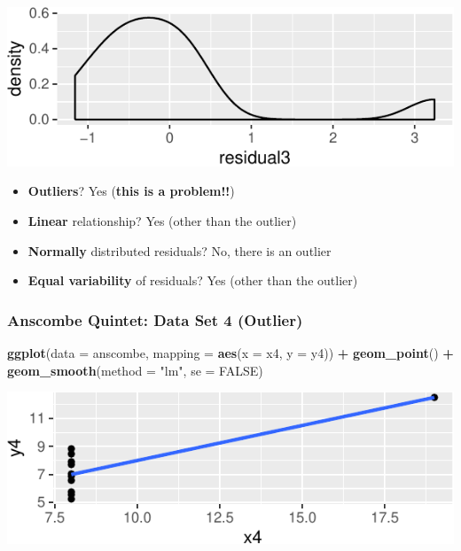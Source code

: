\documentclass[14pt]{extarticle}
\newenvironment{Shaded}{\begin{snugshade}}{\end{snugshade}}
\newcommand{\KeywordTok}[1]{\textcolor[rgb]{0.13,0.29,0.53}{\textbf{#1}}}
\newcommand{\DataTypeTok}[1]{\textcolor[rgb]{0.13,0.29,0.53}{#1}}
\newcommand{\StringTok}[1]{\textcolor[rgb]{0.31,0.60,0.02}{#1}}
\newcommand{\OtherTok}[1]{\textcolor[rgb]{0.56,0.35,0.01}{#1}}
\newcommand{\OperatorTok}[1]{\textcolor[rgb]{0.81,0.36,0.00}{\textbf{#1}}}
\newcommand{\NormalTok}[1]{#1}
\begin{document}
\includegraphics{20181112_anscombe_residuals_files/figure-latex/unnamed-chunk-11-1.pdf}

\begin{itemize}
\item
  \textbf{Outliers}? Yes (\textbf{this is a problem!!})
\item
  \textbf{Linear} relationship? Yes (other than the outlier)
\item
  \textbf{Normally} distributed residuals? No, there is an outlier
\item
  \textbf{Equal variability} of residuals? Yes (other than the outlier)
\end{itemize}

\newpage

\subsubsection{Anscombe Quintet: Data Set 4
(Outlier)}\label{anscombe-quintet-data-set-4-outlier}

\begin{Shaded}
\begin{Highlighting}[]
\KeywordTok{ggplot}\NormalTok{(}\DataTypeTok{data =}\NormalTok{ anscombe, }\DataTypeTok{mapping =} \KeywordTok{aes}\NormalTok{(}\DataTypeTok{x =}\NormalTok{ x4, }\DataTypeTok{y =}\NormalTok{ y4)) }\OperatorTok{+}
\StringTok{  }\KeywordTok{geom_point}\NormalTok{() }\OperatorTok{+}
\StringTok{  }\KeywordTok{geom_smooth}\NormalTok{(}\DataTypeTok{method =} \StringTok{"lm"}\NormalTok{, }\DataTypeTok{se =} \OtherTok{FALSE}\NormalTok{)}
\end{Highlighting}
\end{Shaded}

\includegraphics{20181112_anscombe_residuals_files/figure-latex/unnamed-chunk-12-1.pdf}
\end{document}
